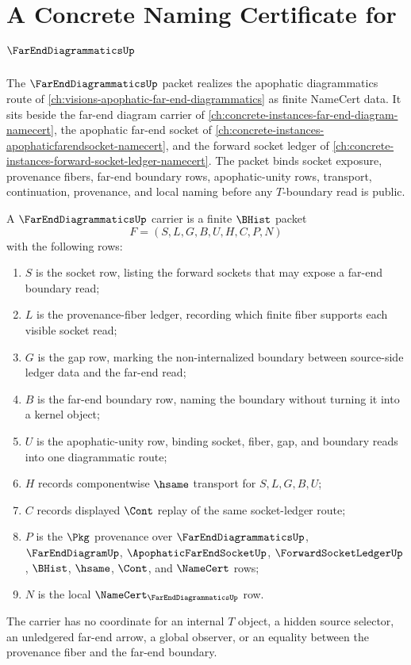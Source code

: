 \chapter{A Concrete Naming Certificate for $\FarEndDiagrammaticsUp$}
\label{ch:concrete-instances-far-end-diagrammatics-namecert}

The $\FarEndDiagrammaticsUp$ packet realizes the apophatic diagrammatics route of \autoref{ch:visions-apophatic-far-end-diagrammatics} as finite NameCert data. It sits beside the far-end diagram carrier of \autoref{ch:concrete-instances-far-end-diagram-namecert}, the apophatic far-end socket of \autoref{ch:concrete-instances-apophaticfarendsocket-namecert}, and the forward socket ledger of \autoref{ch:concrete-instances-forward-socket-ledger-namecert}. The packet binds socket exposure, provenance fibers, far-end boundary rows, apophatic-unity rows, transport, continuation, provenance, and local naming before any $T$-boundary read is public.


\begin{definition}\label{def:far-end-diagrammatics-carrier}
A $\FarEndDiagrammaticsUp$ carrier is a finite $\BHist$ packet
$$
F=(S,L,G,B,U,H,C,P,N)
$$
with the following rows:
\begin{enumerate}
\item $S$ is the socket row, listing the forward sockets that may expose a far-end boundary read;
\item $L$ is the provenance-fiber ledger, recording which finite fiber supports each visible socket read;
\item $G$ is the gap row, marking the non-internalized boundary between source-side ledger data and the far-end read;
\item $B$ is the far-end boundary row, naming the boundary without turning it into a kernel object;
\item $U$ is the apophatic-unity row, binding socket, fiber, gap, and boundary reads into one diagrammatic route;
\item $H$ records componentwise $\hsame$ transport for $S,L,G,B,U$;
\item $C$ records displayed $\Cont$ replay of the same socket-ledger route;
\item $P$ is the $\Pkg$ provenance over $\FarEndDiagrammaticsUp$, $\FarEndDiagramUp$, $\ApophaticFarEndSocketUp$, $\ForwardSocketLedgerUp$, $\BHist$, $\hsame$, $\Cont$, and $\NameCert$ rows;
\item $N$ is the local $\NameCert_{\FarEndDiagrammaticsUp}$ row.
\end{enumerate}
The carrier has no coordinate for an internal $T$ object, a hidden source selector, an unledgered far-end arrow, a global observer, or an equality between the provenance fiber and the far-end boundary.
\end{definition}

